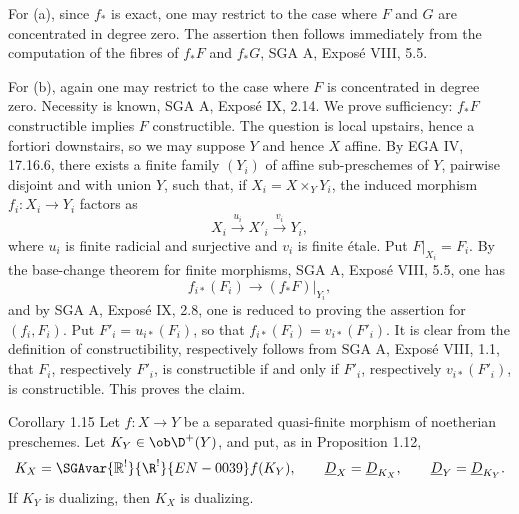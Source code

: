 \begin{prooftext}
For (a), since $f_*$ is exact, one may restrict to the case where $F$ and $G$ are concentrated in degree zero. The assertion then follows immediately from the computation of the fibres of $f_*F$ and $f_*G$, SGA A, Exposé VIII, 5.5.

For (b), again one may restrict to the case where $F$ is concentrated in degree zero. Necessity is known, SGA A, Exposé IX, 2.14. We prove sufficiency: $f_*F$ constructible implies $F$ constructible. The question is local upstairs, hence a fortiori downstairs, so we may suppose $Y$ and hence $X$ affine. By EGA IV, 17.16.6, there exists a finite family $(Y_i)$ of affine sub-preschemes of $Y$, pairwise disjoint and with union $Y$, such that, if $X_i=X\times_YY_i$, the induced morphism $f_i:X_i\to Y_i$ factors as
\[
   X_i\xrightarrow{u_i}X'_i\xrightarrow{v_i}Y_i,
\]
where $u_i$ is finite radicial and surjective and $v_i$ is finite étale. Put $F|_{X_i}=F_i$. By the base-change theorem for finite morphisms, SGA A, Exposé VIII, 5.5, one has
\[
   f_{i*}(F_i)\to(f_*F)|_{Y_i},
\]
and by SGA A, Exposé IX, 2.8, one is reduced to proving the assertion for $(f_i,F_i)$. Put $F'_i=u_{i*}(F_i)$, so that $f_{i*}(F_i)=v_{i*}(F'_i)$. It is clear from the definition of constructibility, respectively follows from SGA A, Exposé VIII, 1.1, that $F_i$, respectively $F'_i$, is constructible if and only if $F'_i$, respectively $v_{i*}(F'_i)$, is constructible. This proves the claim. \qedtext
\end{prooftext}

\begin{statement}{Corollary 1.15}
Let $f:X\to Y$ be a separated quasi-finite morphism of noetherian preschemes. Let $K_Y\in\ob\D^+(Y)$, and put, as in Proposition 1.12,
\[
   K_X=\SGAvar{\mathbb{R}^!}{\R^!}{EN-0039}f(K_Y),\qquad \underline D_X=\underline D_{K_X},\qquad \underline D_Y=\underline D_{K_Y}.
\]
If $K_Y$ is dualizing, then $K_X$ is dualizing.
\end{statement}

